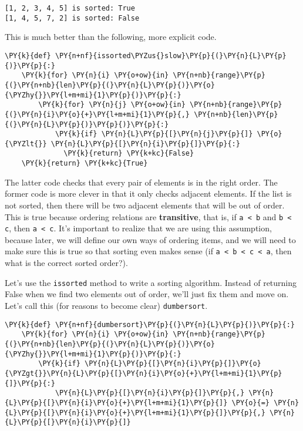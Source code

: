 \begin{Verbatim}
[1, 2, 3, 4, 5] is sorted: True
[1, 4, 5, 7, 2] is sorted: False
\end{Verbatim}


This is much better than the following, more explicit code.

\begin{Verbatim}[commandchars=\\\{\}]
\PY{k}{def} \PY{n+nf}{issorted\PYZus{}slow}\PY{p}{(}\PY{n}{L}\PY{p}{)}\PY{p}{:}
    \PY{k}{for} \PY{n}{i} \PY{o+ow}{in} \PY{n+nb}{range}\PY{p}{(}\PY{n+nb}{len}\PY{p}{(}\PY{n}{L}\PY{p}{)}\PY{o}{\PYZhy{}}\PY{l+m+mi}{1}\PY{p}{)}\PY{p}{:}
        \PY{k}{for} \PY{n}{j} \PY{o+ow}{in} \PY{n+nb}{range}\PY{p}{(}\PY{n}{i}\PY{o}{+}\PY{l+m+mi}{1}\PY{p}{,} \PY{n+nb}{len}\PY{p}{(}\PY{n}{L}\PY{p}{)}\PY{p}{)}\PY{p}{:}
            \PY{k}{if} \PY{n}{L}\PY{p}{[}\PY{n}{j}\PY{p}{]} \PY{o}{\PYZlt{}} \PY{n}{L}\PY{p}{[}\PY{n}{i}\PY{p}{]}\PY{p}{:}
              \PY{k}{return} \PY{k+kc}{False}
    \PY{k}{return} \PY{k+kc}{True}
\end{Verbatim}



The latter code checks that every pair of elements is in the right order.
The former code is more clever in that it only checks adjacent elements.
If the list is not sorted, then there will be two adjacent elements that will be out of order.
This is true because ordering relations are \textbf{transitive}, that is, if \texttt{a < b} and \texttt{b < c}, then \texttt{a < c}.
It's important to realize that we are using this assumption, because later, we will define our own ways of ordering items, and we will need to make sure this is true so that sorting even makes sense (if \texttt{a < b < c < a}, then what is the correct sorted order?).


Let's use the \texttt{issorted} method to write a sorting algorithm.
Instead of returning False when we find two elements out of order, we'll just fix them and move on.  Let's call this (for reasons to become clear) \texttt{dumbersort}.

\begin{Verbatim}[commandchars=\\\{\}]
\PY{k}{def} \PY{n+nf}{dumbersort}\PY{p}{(}\PY{n}{L}\PY{p}{)}\PY{p}{:}
    \PY{k}{for} \PY{n}{i} \PY{o+ow}{in} \PY{n+nb}{range}\PY{p}{(}\PY{n+nb}{len}\PY{p}{(}\PY{n}{L}\PY{p}{)}\PY{o}{\PYZhy{}}\PY{l+m+mi}{1}\PY{p}{)}\PY{p}{:}
        \PY{k}{if} \PY{n}{L}\PY{p}{[}\PY{n}{i}\PY{p}{]}\PY{o}{\PYZgt{}}\PY{n}{L}\PY{p}{[}\PY{n}{i}\PY{o}{+}\PY{l+m+mi}{1}\PY{p}{]}\PY{p}{:}
            \PY{n}{L}\PY{p}{[}\PY{n}{i}\PY{p}{]}\PY{p}{,} \PY{n}{L}\PY{p}{[}\PY{n}{i}\PY{o}{+}\PY{l+m+mi}{1}\PY{p}{]} \PY{o}{=} \PY{n}{L}\PY{p}{[}\PY{n}{i}\PY{o}{+}\PY{l+m+mi}{1}\PY{p}{]}\PY{p}{,} \PY{n}{L}\PY{p}{[}\PY{n}{i}\PY{p}{]}
\end{Verbatim}



